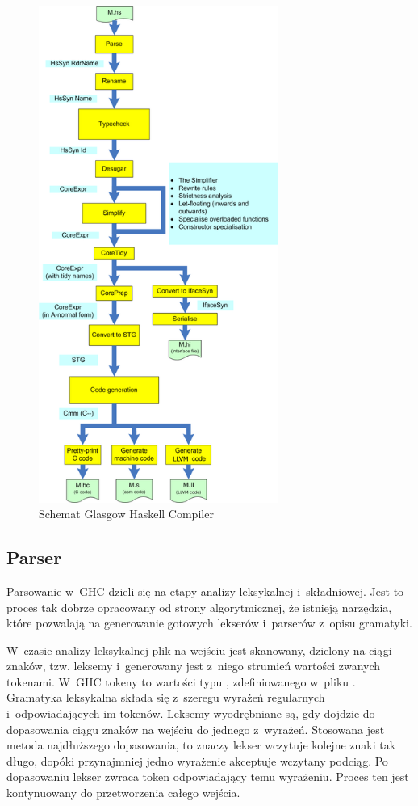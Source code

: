 \begin{figure}[H]
    \centering
    \includegraphics[width=0.7\textwidth]{images/AOSA_compiler}
    \caption[Schemat Glasgow Haskell Compiler]{Schemat Glasgow Haskell Compiler\cite{AOSA}}
    \label{fig:AOSA_compiler}
\end{figure}

\subsection{Parser}\label{sec:parser}
Parsowanie w~GHC dzieli się na etapy analizy leksykalnej i~składniowej. Jest to
proces tak dobrze opracowany od strony algorytmicznej, że istnieją narzędzia,
które pozwalają na generowanie gotowych lekserów i~parserów z~opisu gramatyki.

W~czasie analizy leksykalnej plik na wejściu jest skanowany, dzielony na ciągi
znaków, tzw. leksemy i~generowany jest z~niego strumień wartości zwanych tokenami.
W~GHC tokeny to wartości typu , zdefiniowanego w~pliku .
Gramatyka leksykalna składa się z~szeregu wyrażeń regularnych i~odpowiadających im tokenów.
Leksemy wyodrębniane są, gdy dojdzie do dopasowania ciągu znaków na wejściu do jednego z~wyrażeń.
Stosowana jest metoda najdłuższego dopasowania, to znaczy lekser
wczytuje kolejne znaki tak długo, dopóki przynajmniej jedno wyrażenie akceptuje
wczytany podciąg. Po dopasowaniu lekser zwraca token odpowiadający temu wyrażeniu.
Proces ten jest kontynuowany do przetworzenia całego wejścia.


